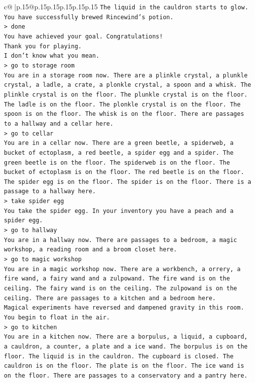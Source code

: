 \documentclass{article}
\begin{document}
{\begin{supertabular}{c@{$\;$}|p{.15\linewidth}@{}p{.15\linewidth}p{.15\linewidth}p{.15\linewidth}p{.15\linewidth}p{.15\linewidth}}
{{{\texttt{The liquid in the cauldron starts to glow.} \\
\texttt{You have successfully brewed Rincewind's potion.} \\
\texttt{> done} \\
\texttt{You have achieved your goal. Congratulations!} \\
\texttt{Thank you for playing.} \\
\texttt{I don't know what you mean.} \\
\texttt{> go to storage room} \\
\texttt{You are in a storage room now. There are a plinkle crystal, a plunkle crystal, a ladle, a crate, a plonkle crystal, a spoon and a whisk. The plinkle crystal is on the floor. The plunkle crystal is on the floor. The ladle is on the floor. The plonkle crystal is on the floor. The spoon is on the floor. The whisk is on the floor. There are passages to a hallway and a cellar here.} \\
\texttt{> go to cellar} \\
\texttt{You are in a cellar now. There are a green beetle, a spiderweb, a bucket of ectoplasm, a red beetle, a spider egg and a spider. The green beetle is on the floor. The spiderweb is on the floor. The bucket of ectoplasm is on the floor. The red beetle is on the floor. The spider egg is on the floor. The spider is on the floor. There is a passage to a hallway here.} \\
\texttt{> take spider egg} \\
\texttt{You take the spider egg. In your inventory you have a peach and a spider egg.} \\
\texttt{> go to hallway} \\
\texttt{You are in a hallway now. There are passages to a bedroom, a magic workshop, a reading room and a broom closet here.} \\
\texttt{> go to magic workshop} \\
\texttt{You are in a magic workshop now. There are a workbench, a orrery, a fire wand, a fairy wand and a zulpowand. The fire wand is on the ceiling. The fairy wand is on the ceiling. The zulpowand is on the ceiling. There are passages to a kitchen and a bedroom here.} \\
\texttt{Magical experiments have reversed and dampened gravity in this room. You begin to float in the air.} \\
\texttt{> go to kitchen} \\
\texttt{You are in a kitchen now. There are a borpulus, a liquid, a cupboard, a cauldron, a counter, a plate and a ice wand. The borpulus is on the floor. The liquid is in the cauldron. The cupboard is closed. The cauldron is on the floor. The plate is on the floor. The ice wand is on the floor. There are passages to a conservatory and a pantry here.} \\
}}}
\end{supertabular}}
\end{document}
